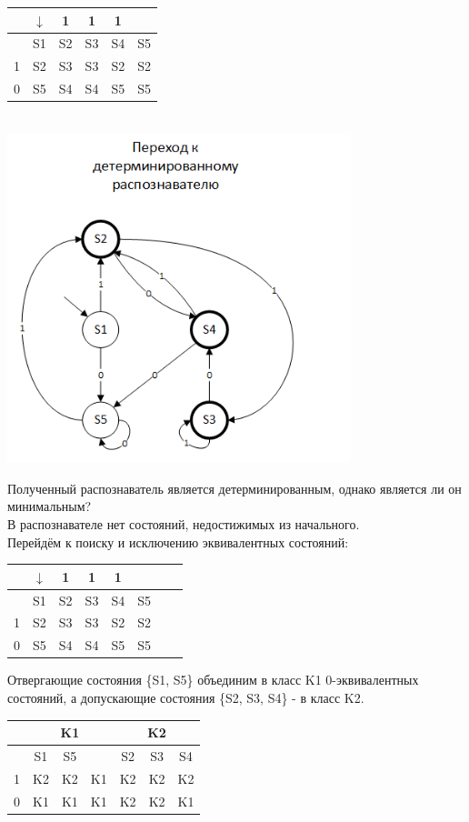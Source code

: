 \documentclass[a4paper,14pt]{extarticle}
\begin{document}
\begin{enumerate}[1.]
\begin{tabular}{|c|c|c|c|c|c|}
    \hline
& $\downarrow$ & 1&1&1&\\
\hline
  & S1 & S2 & S3 & S4 & S5\\
\hline
1 & S2 & S3 & S3 & S2 & S2\\
\hline
0 & S5 & S4 & S4 & S5 & S5\\
\hline
\end{tabular}\\
\includegraphics[width=100mm]{task3_new_determined}

Полученный распознаватель является детерминированным, однако является ли он 
минимальным?\\
В распознавателе нет состояний, недостижимых из начального.\\
Перейдём к поиску и исключению эквивалентных состояний:\\
\begin{tabular}{|c|c|c|c|c|c|c|c|}
    \hline
    & $\downarrow$ & 1&1&1&&\\
    \hline
      & S1 & S2 & S3 & S4 & S5&\\
    \hline
    1 & S2 & S3 & S3 & S2 & S2&\\
    \hline
    0 & S5 & S4 & S4 & S5 & S5&\\
    \hline
\end{tabular}

Отвергающие состояния \{S1, S5\} объединим в класс K1 0-эквивалентных состояний, 
а допускающие состояния \{S2, S3, S4\} - в класс K2.

\begin{tabular}{|c|c|c|c|c|c|c|}
    \hline
    & \multicolumn{3}{c|}{K1} & \multicolumn{3}{c|}{K2} \\
    \hline
      & S1 & S5 &    & S2 & S3 & S4 \\
    \hline
    1 & K2 & K2 & K1 & K2 & K2 & K2 \\
    \hline
    0 & K1 & K1 & K1 & K2 & K2 & K1 \\
    \hline
\end{tabular}


\end{enumerate}
\end{document}
